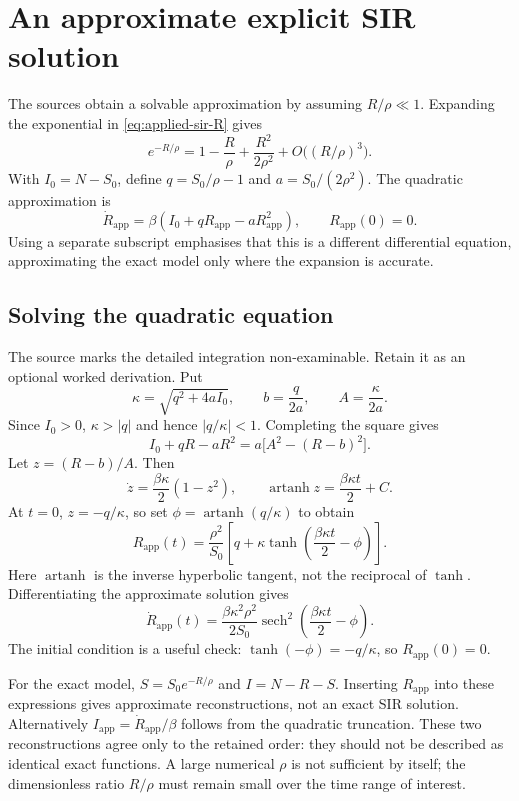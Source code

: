\section{An approximate explicit SIR solution}
The sources obtain a solvable approximation by assuming $R/\rho\ll1$.
Expanding the exponential in \eqref{eq:applied-sir-R} gives
\[
e^{-R/\rho}=1-\frac R\rho+\frac{R^2}{2\rho^2}
+O\bigl((R/\rho)^3\bigr).
\]
With $I_0=N-S_0$, define $q=S_0/\rho-1$ and $a=S_0/(2\rho^2)$.
The quadratic approximation is
\begin{equation}\label{eq:applied-sir-approx}
\dot R_{\mathrm{app}}=\beta(I_0+qR_{\mathrm{app}}-aR_{\mathrm{app}}^2),
\qquad R_{\mathrm{app}}(0)=0.
\end{equation}
Using a separate subscript emphasises that this is a different differential
equation, approximating the exact model only where the expansion is accurate.

\subsection{Solving the quadratic equation}
The source marks the detailed integration non-examinable. Retain it as an
optional worked derivation. Put
\[
\kappa=\sqrt{q^2+4aI_0},\qquad
b=\frac q{2a},\qquad A=\frac\kappa{2a}.
\]
Since $I_0>0$, $\kappa>|q|$ and hence $|q/\kappa|<1$.
Completing the square gives
\[
I_0+qR-aR^2=a\bigl[A^2-(R-b)^2\bigr].
\]
Let $z=(R-b)/A$. Then
\[
\dot z=\frac{\beta\kappa}{2}(1-z^2),\qquad
\operatorname{artanh}z=\frac{\beta\kappa t}{2}+C.
\]
At $t=0$, $z=-q/\kappa$, so set
$\phi=\operatorname{artanh}(q/\kappa)$ to obtain
\begin{equation}\label{eq:applied-sir-tanh}
R_{\mathrm{app}}(t)=\frac{\rho^2}{S_0}
\left[q+\kappa\tanh\left(\frac{\beta\kappa t}{2}-\phi\right)\right].
\end{equation}
Here $\operatorname{artanh}$ is the inverse hyperbolic tangent, not the
reciprocal of $\tanh$. Differentiating the approximate solution gives
\[
\dot R_{\mathrm{app}}(t)=\frac{\beta\kappa^2\rho^2}{2S_0}
\operatorname{sech}^2\left(\frac{\beta\kappa t}{2}-\phi\right).
\]
The initial condition is a useful check: $\tanh(-\phi)=-q/\kappa$, so
$R_{\mathrm{app}}(0)=0$.

\begin{remark}
For the exact model, $S=S_0e^{-R/\rho}$ and $I=N-R-S$.
Inserting $R_{\mathrm{app}}$ into these expressions gives approximate
reconstructions, not an exact SIR solution. Alternatively
$I_{\mathrm{app}}=\dot R_{\mathrm{app}}/\beta$ follows from the quadratic
truncation. These two reconstructions agree only to the retained order:
they should not be described as identical exact functions.
A large numerical $\rho$ is not sufficient by itself; the dimensionless
ratio $R/\rho$ must remain small over the time range of interest.
\end{remark}

